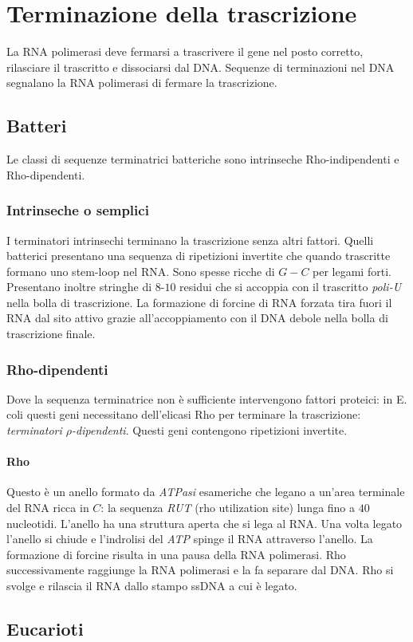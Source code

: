 \section{Terminazione della trascrizione}
La RNA polimerasi deve fermarsi a trascrivere il gene nel posto corretto, rilasciare il trascritto e dissociarsi dal DNA. Sequenze di terminazioni nel DNA segnalano la RNA polimerasi 
di fermare la trascrizione. 
\subsection{Batteri}
Le classi di sequenze terminatrici batteriche sono intrinseche Rho-indipendenti e Rho-dipendenti. 
\subsubsection{Intrinseche o semplici}
I terminatori intrinsechi terminano la trascrizione senza altri fattori. Quelli batterici presentano una sequenza di ripetizioni invertite che quando trascritte formano uno stem-loop 
nel RNA. Sono spesse ricche di $G-C$ per legami forti. Presentano inoltre stringhe di $8$-$10$ residui che si accoppia con il trascritto \emph{poli-U} nella bolla di trascrizione. La 
formazione di forcine di RNA forzata tira fuori il RNA dal sito attivo grazie all'accoppiamento con il DNA debole nella bolla di trascrizione finale. 
\subsubsection{Rho-dipendenti}
Dove la sequenza terminatrice non \`e sufficiente intervengono fattori proteici: in E. coli questi geni necessitano dell'elicasi Rho per terminare la trascrizione: 
\emph{terminatori $\rho$-dipendenti}. Questi geni contengono ripetizioni invertite. 
\paragraph{Rho} Questo \`e un anello formato da \emph{ATPasi} esameriche che legano a un'area terminale del RNA ricca in $C$: la sequenza \emph{RUT} (rho utilization site) lunga fino
a $40$ nucleotidi. L'anello ha una struttura aperta che si lega al RNA. Una volta legato l'anello si chiude e l'indrolisi del \emph{ATP} spinge il RNA attraverso l'anello. La formazione
di forcine risulta in una pausa della RNA polimerasi. Rho successivamente raggiunge la RNA polimerasi e la fa separare dal DNA. Rho si svolge e rilascia il RNA dallo stampo ssDNA
a cui \`e legato. 
\subsection{Eucarioti}
